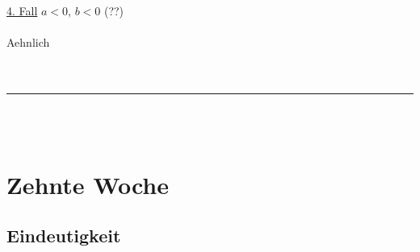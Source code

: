 \documentclass[18pt,a4paper]{article}
\begin{document}
\\
\\         
\uline{4. Fall} $a< 0$, $b<0$ (??)\\
\\
Aehnlich\\
\\
\\
\rule{\textwidth}{0.4mm}\\
\\

\section{Zehnte Woche}

\subsection{Eindeutigkeit}
\end{document}
